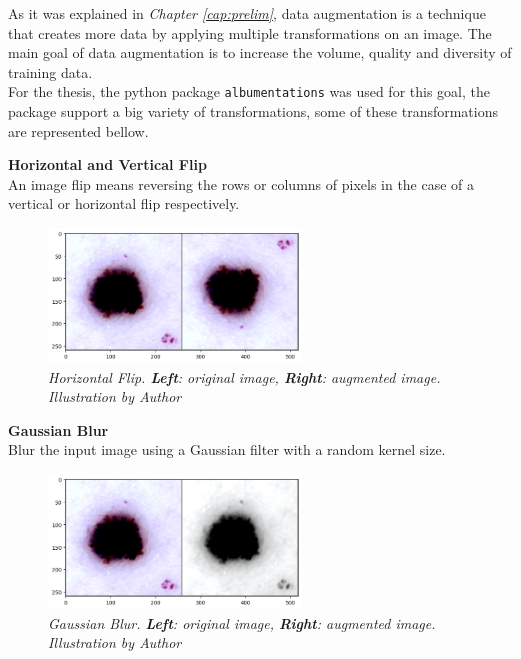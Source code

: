 As it was explained in \textit{Chapter \ref{cap:prelim}}, data augmentation is
a technique that creates more data by applying multiple transformations on an
image. The  main goal of data augmentation is to increase the volume, quality
and diversity of training data. \\

For the thesis, the python package {\tt albumentations} was used for this goal,
the package support a big variety of transformations, some of these
transformations are represented bellow.

\newpage

\textbf{Horizontal and Vertical Flip} \\

An image flip means reversing the rows or columns of pixels in the case of a vertical or horizontal flip respectively.

\begin{figure}[H]
  \centering
  \includegraphics[width=0.6\textwidth]{imatges/methodological_contribution/horizontal-flip.png}
  \caption[Horizontal Flip]{\textit{Horizontal Flip. \textbf{Left}: original image, \textbf{Right}: augmented image. Illustration by Author}}
\end{figure}

\vspace{0.5cm}
\textbf{Gaussian Blur} \\

Blur the input image using a Gaussian filter with a random kernel size.

\begin{figure}[H]
  \centering
  \includegraphics[width=0.6\textwidth]{imatges/methodological_contribution/gaussianblur.png}
  \caption[Gaussian Blur]{\textit{Gaussian Blur. \textbf{Left}: original image, \textbf{Right}: augmented image. Illustration by Author}}
\end{figure}

